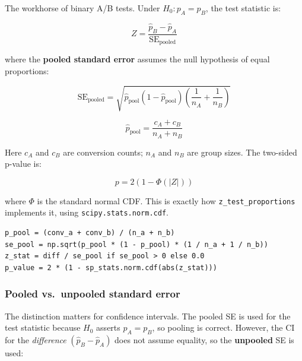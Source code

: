 The workhorse of binary A/B tests. Under $H_0: p_A = p_B$, the test statistic is:

\begin{equation}
  Z = \frac{\hat{p}_B - \hat{p}_A}{\mathrm{SE}_{\mathrm{pooled}}}
  \label{eq:zstat}
\end{equation}

where the \textbf{pooled standard error} assumes the null hypothesis of equal
proportions:

\begin{equation}
  \mathrm{SE}_{\mathrm{pooled}} = \sqrt{\hat{p}_{\mathrm{pool}}
    \left(1 - \hat{p}_{\mathrm{pool}}\right)
    \left(\frac{1}{n_A} + \frac{1}{n_B}\right)}
  \label{eq:se-pool}
\end{equation}

\begin{equation}
  \hat{p}_{\mathrm{pool}} = \frac{c_A + c_B}{n_A + n_B}
  \label{eq:ppool}
\end{equation}

Here $c_A$ and $c_B$ are conversion counts; $n_A$ and $n_B$ are group sizes.
The two-sided p-value is:

\begin{equation}
  p = 2\left(1 - \Phi\left(|Z|\right)\right)
\end{equation}

where $\Phi$ is the standard normal CDF. This is exactly how
\texttt{z\_test\_proportions} implements it, using \texttt{scipy.stats.norm.cdf}.

\begin{lstlisting}[style=python, caption={z\_test\_proportions -- core computation (stats\_engine.py lines 38--43)}]
p_pool = (conv_a + conv_b) / (n_a + n_b)
se_pool = np.sqrt(p_pool * (1 - p_pool) * (1 / n_a + 1 / n_b))
z_stat = diff / se_pool if se_pool > 0 else 0.0
p_value = 2 * (1 - sp_stats.norm.cdf(abs(z_stat)))
\end{lstlisting}

\subsubsection{Pooled vs.\ unpooled standard error}

The distinction matters for confidence intervals. The pooled SE is used for the
test statistic because $H_0$ asserts $p_A = p_B$, so pooling is correct.
However, the CI for the \emph{difference} $(\hat{p}_B - \hat{p}_A)$ does not
assume equality, so the \textbf{unpooled} SE is used:

